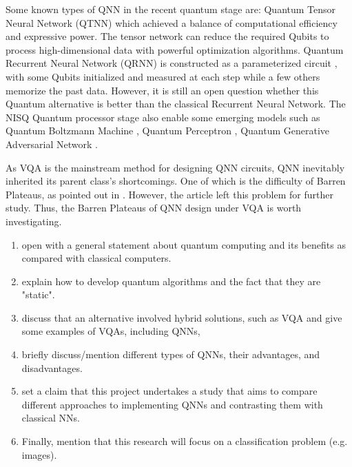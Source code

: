 Some known types of QNN in the recent quantum stage are: 
Quantum Tensor Neural Network (QTNN) \cite{hugginsQuantumMachineLearning2019} which achieved a balance of computational efficiency and expressive power. 
The tensor network can reduce the required Qubits to process high-dimensional data with powerful optimization algorithms.
Quantum Recurrent Neural Network (QRNN) is constructed as a parameterized circuit \cite{takakiLearningTemporalData2021}, with some Qubits initialized and measured at each step while a few others memorize the past data.
However, it is still an open question whether this Quantum alternative is better than the classical Recurrent Neural Network.
The NISQ Quantum processor stage also enable some emerging models such as 
Quantum Boltzmann Machine \cite{shinguBoltzmannMachineLearning2021}\cite{zoufalVariationalQuantumBoltzmann2021}, 
Quantum Perceptron \cite{kristensenArtificialSpikingQuantum2021}, 
Quantum Generative Adversarial Network \cite{dallaire-demersQuantumGenerativeAdversarial2018}\cite{lloydQuantumGenerativeAdversarial2018}.

As VQA is the mainstream method for designing QNN circuits, QNN inevitably inherited its parent class's shortcomings.
One of which is the difficulty of Barren Plateaus, as pointed out in \cite{abbasPowerQuantumNeural2021}. However, the article left this problem for further study. Thus, the Barren Plateaus of QNN design under VQA is worth investigating.

\begin{enumerate}
    \item open with a general statement about quantum computing and its benefits as compared with classical computers.
    \item explain how to develop quantum algorithms and the fact that they are "static".
    \item discuss that an alternative involved hybrid solutions, such as VQA and give some examples of VQAs, including QNNs, 
    \item briefly discuss/mention different types of QNNs, their advantages, and disadvantages.
    \item set a claim that this project undertakes a study that aims to compare different approaches to implementing QNNs and contrasting them with classical NNs.
    \item Finally, mention that this research will focus on a classification problem (e.g. images).
\end{enumerate}